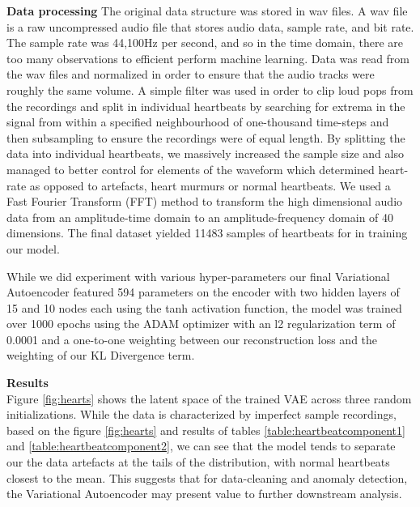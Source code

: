 \documentclass[12pt]{article}
\begin{document}
\textbf{Data processing}\newline
The original data structure was stored in wav files. A wav file is a raw uncompressed audio file that stores audio data, sample rate, and bit rate. The sample rate was 44,100Hz per second, and so in the time domain, there are too many observations to efficient perform machine learning. Data was read from the wav files and normalized in order to ensure that the audio tracks were roughly the same volume.  A simple filter was used in order to clip loud pops from the recordings and split in individual heartbeats by searching for extrema in the signal from within a specified neighbourhood of one-thousand time-steps and then subsampling to ensure the recordings were of equal length.  By splitting the data into individual heartbeats, we massively increased the sample size and also managed to better control for elements of the waveform which determined heart-rate as opposed to artefacts, heart murmurs or normal heartbeats.  We used a Fast Fourier Transform (FFT) method to transform the high dimensional audio data from an amplitude-time domain to an amplitude-frequency domain of 40 dimensions. The final dataset yielded 11483 samples of heartbeats for in training our model.  

While we did experiment with various hyper-parameters our final Variational Autoencoder featured 594 parameters on the encoder with two hidden layers of 15 and 10 nodes each using the tanh activation function, the model was trained over 1000 epochs using the ADAM optimizer with an l2 regularization term of 0.0001 and a one-to-one weighting between our reconstruction loss and the weighting of our KL Divergence term.   

\textbf{Results} \\
Figure \ref{fig:hearts} shows the latent space of the trained VAE across three random initializations.  While the data is characterized by imperfect sample recordings, based on the figure \ref{fig:hearts} and results of tables \ref{table:heartbeatcomponent1} and \ref{table:heartbeatcomponent2}, we can see that the model tends to separate our the data artefacts at the tails of the distribution, with normal heartbeats closest to the mean.  This suggests that for data-cleaning and anomaly detection, the Variational Autoencoder may present value to further downstream analysis.  
\end{document}
